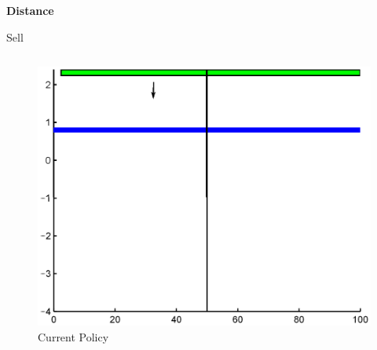 \documentclass{beamer}
\begin{document}
\begin{frame}
{\bf Distance}


{\large Sell}
\begin{columns}
\begin{figure}[hbt]
  \includegraphics[scale = 0.4]{Where2Move0step.eps}
  \caption{Current Policy}
\end{figure}
\end{columns}
\end{frame}
\end{document}
